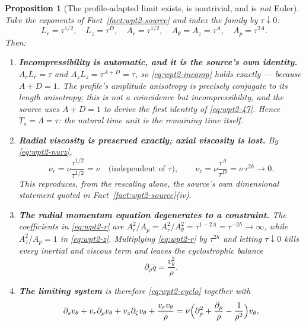 \documentclass[11pt]{article}
\newtheorem{proposition}[theorem]{Proposition}
\theoremstyle{definition}
\theoremstyle{remark}
\begin{document}
\begin{proposition}[The profile-adapted limit exists, is nontrivial, and is
  \emph{not} Euler]\label{prop:wpt2-limit}
  Take the exponents of Fact~\ref{fact:wpt2-source} and index the family by
  $\tau\downarrow0$:
  \[
    L_r=\tau^{1/2},\quad L_z=\tau^{D},\quad
    A_r=\tau^{1/2},\quad A_\theta=A_z=\tau^{A},\quad A_p=\tau^{2A}.
  \]
  Then:
  \begin{enumerate}[label=\textup{(\roman*)},leftmargin=2.6em]
    \item \textbf{Incompressibility is automatic, and it is the source's own
      identity.} $A_rL_r=\tau$ and $A_zL_z=\tau^{A+D}=\tau$, so
      \eqref{eq:wpt2-incomp} holds \emph{exactly} --- because $A+D=1$. The
      profile's amplitude anisotropy is precisely conjugate to its length
      anisotropy; this is not a coincidence but incompressibility, and the
      source uses $A+D=1$ to derive the first identity of
      \eqref{eq:wpt2-47}. Hence $T_s=\Lambda=\tau$: the natural time unit is
      the remaining time itself.
    \item \textbf{Radial viscosity is preserved exactly; axial viscosity is
      lost.} By \eqref{eq:wpt2-nurz},
      \[
        \nu_r=\nu\frac{\tau^{1/2}}{\tau^{1/2}}=\nu
        \quad\text{(independent of $\tau$)},
        \qquad
        \nu_z=\nu\frac{\tau^{A}}{\tau^{D}}=\nu\,\tau^{2h}
        \longrightarrow0 .
      \]
      This reproduces, from the rescaling alone, the source's own
      dimensional statement quoted in Fact~\ref{fact:wpt2-source}(iv).
    \item \textbf{The radial momentum equation degenerates to a
      constraint.} The coefficients in \eqref{eq:wpt2-r} are
      $A_r^2/A_p=A_r^2/A_\theta^2=\tau^{1-2A}=\tau^{-2h}\to\infty$, while
      $A_z^2/A_p=1$ in \eqref{eq:wpt2-z}. Multiplying \eqref{eq:wpt2-r} by
      $\tau^{2h}$ and letting $\tau\downarrow0$ kills every inertial and
      viscous term and leaves the \emph{cyclostrophic balance}
      \begin{equation}\label{eq:wpt2-cyclo}
        \partial_\rho\tilde q=\frac{v_\theta^2}{\rho}.
      \end{equation}
    \item \textbf{The limiting system} is therefore
      \eqref{eq:wpt2-cyclo} together with
      \begin{align*}
        \partial_sv_\theta+v_r\partial_\rho v_\theta
          +v_z\partial_\zeta v_\theta+\frac{v_rv_\theta}{\rho}
          &=\nu\Bigl(\partial_\rho^2+\frac{\partial_\rho}{\rho}
            -\frac1{\rho^2}\Bigr)v_\theta,\\

\end{align*}
\end{enumerate}
\end{proposition}
\end{document}
